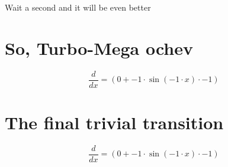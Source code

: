 \documentclass[a4paper, 12pt]{article}
\begin{document}
 Wait a second and it will be even better
\section{So, Turbo-Mega ochev}\begin{equation*}
    \frac{d}{dx} = ({{0}}+{{{{-1}}\cdot{\sin({{{-1}}\cdot{{x}}})}}\cdot{{-1}}})
\end{equation*}

\section{The final trivial transition}\begin{equation*}
    \frac{d}{dx} = ({{0}}+{{{{-1}}\cdot{\sin({{{-1}}\cdot{{x}}})}}\cdot{{-1}}})
\end{equation*}
\end{document}
